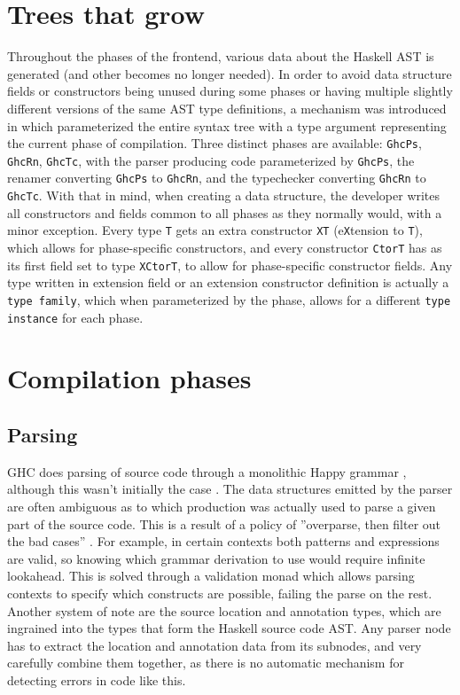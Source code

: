 \documentclass[en]{pracamgr}
\begin{document}
\section{Trees that grow}
Throughout the phases of the frontend, various data about the Haskell AST is generated (and other becomes no longer needed).
In order to avoid data structure fields or constructors being unused during some phases or having multiple slightly different versions of the same AST type definitions,
a mechanism was introduced in \cite{Najd2017TreesTG} which parameterized the entire syntax tree with a type argument representing the current phase of compilation.
Three distinct phases are available: \texttt{GhcPs}, \texttt{GhcRn}, \texttt{GhcTc},
with the parser producing code parameterized by \texttt{GhcPs}, the renamer converting \texttt{GhcPs} to \texttt{GhcRn},
and the typechecker converting \texttt{GhcRn} to \texttt{GhcTc}. 
With that in mind, when creating a data structure,
the developer writes all constructors and fields common to all phases as they normally would, with a minor exception.
Every type \texttt{T} gets an extra constructor \texttt{XT} (e\texttt{X}tension to \texttt{T}), which allows for phase-specific constructors,
and every constructor \texttt{CtorT} has as its first field set to type \texttt{XCtorT}, to allow for phase-specific constructor fields.
Any type written in extension field or an extension constructor definition is actually a \texttt{type family},
which when parameterized by the phase, allows for a different \texttt{type instance} for each phase.
\section{Compilation phases}
\subsection{Parsing}
GHC does parsing of source code through a monolithic Happy grammar \cite{Happy}, although this wasn't initially the case \cite{Jones1993TheGH}.
The data structures emitted by the parser are often ambiguous as to which production was actually used to parse a given part of the source code.
This is a result of a policy of ''overparse, then filter out the bad cases'' \cite{ParserWiki}.
For example, in certain contexts both patterns and expressions are valid, so knowing which grammar derivation to use would require infinite lookahead.
This is solved through a validation monad which allows parsing contexts to specify which constructs are possible, failing the parse on the rest.
Another system of note are the source location and annotation types, which are ingrained into the types that form the Haskell source code AST.
Any parser node has to extract the location and annotation data from its subnodes, and very carefully combine them together,
as there is no automatic mechanism for detecting errors in code like this.
\end{document}
